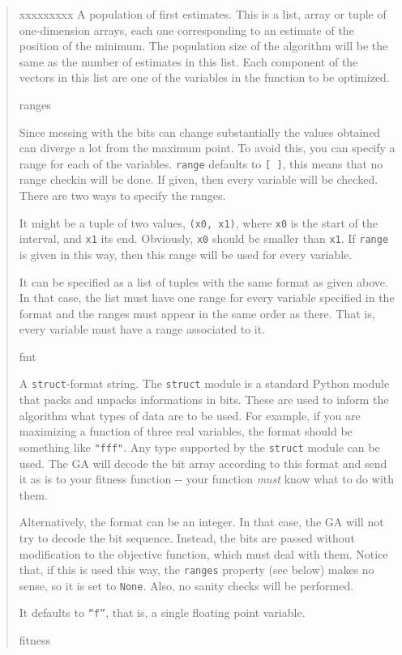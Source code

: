 \begin{boxedminipage}{\funcwidth}
\begin{quote}
\begin{Ventry}{xxxxxxxxx}
A population of first estimates. This is a list, array or tuple of
one-dimension arrays, each one corresponding to an estimate of the
position of the minimum. The population size of the algorithm will
be the same as the number of estimates in this list. Each component
of the vectors in this list are one of the variables in the function
to be optimized.
          \item[ranges]


Since messing with the bits can change substantially the values
obtained can diverge a lot from the maximum point. To avoid this,
you can specify a range for each of the variables. \texttt{range}
defaults to \texttt{{[} {]}}, this means that no range checkin will be done.
If given, then every variable will be checked. There are two ways to
specify the ranges.

It might be a tuple of two values, \texttt{(x0, x1)}, where \texttt{x0} is the
start of the interval, and \texttt{x1} its end. Obviously, \texttt{x0} should
be smaller than \texttt{x1}. If \texttt{range} is given in this way, then this
range will be used for every variable.

It can be specified as a list of tuples with the same format as
given above. In that case, the list must have one range for every
variable specified in the format and the ranges must appear in the
same order as there. That is, every variable must have a range
associated to it.
          \item[fmt]


A \texttt{struct}-format string. The \texttt{struct} module is a standard
Python module that packs and unpacks informations in bits. These
are used to inform the algorithm what types of data are to be used.
For example, if you are maximizing a function of three real
variables, the format should be something like \texttt{"fff"}. Any type
supported by the \texttt{struct} module can be used. The GA will decode
the bit array according to this format and send it as is to your
fitness function -{}- your function \emph{must} know what to do with them.

Alternatively, the format can be an integer. In that case, the GA
will not try to decode the bit sequence. Instead, the bits are
passed without modification to the objective function, which must
deal with them. Notice that, if this is used this way, the
\texttt{ranges} property (see below) makes no sense, so it is set to
\texttt{None}. Also, no sanity checks will be performed.

It defaults to \texttt{``f''}, that is, a single floating point variable.
          \item[fitness]



\end{Ventry}
\end{quote}
\end{boxedminipage}
